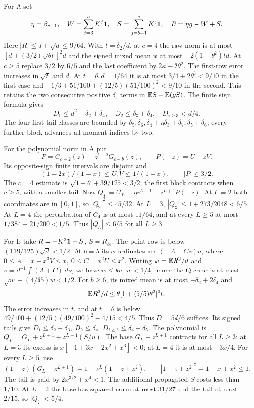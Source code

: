 For A set
\[
 \eta=\beta_{c-1},\quad W=\sum_{j=3}^cK^j\mathbf1,\quad
 S=\sum_{j=b+1}^eK^j\mathbf1,\quad R=\eta g-W+S .
\]
Here \(|R|\le d+\sqrt d\le9/64\).
With \(t=\delta_2/d\), at \(c=4\) the raw norm is at most
\([d+(3/2)\sqrt{\theta t}]^2d\) and the signed mixed mean
is at most \(-2(1-\theta^2)td\).
At \(c\ge5\) replace \(3/2\) by \(6/5\) and the last coefficient
by \(2\kappa-2\theta^2\).
The first-row error increases in \(\sqrt t\) and \(d\).
At \(t=\theta,d=1/64\) it is at most
\(3/4+2\theta^3<9/10\) in the first case and
\(-1/3+51/100+(12/5)(51/100)^2<9/10\) in the second.
This retains the two consecutive positive \(\delta_4\) terms
in \(\mathbb E S-\mathbb E(gS)\).
The finite sign formula gives
\[
 D_1\le d^2+\delta_2+\delta_4,\quad
 D_2\le\delta_3+\delta_4,\quad
 D_{i\ge3}<d/4 .
\]
The four first tail classes are bounded by
\(\delta_5,\delta_6,\delta_4+\eta\delta_3+\delta_7,
\delta_5+\delta_6\); every further block advances all moment
indices by two.

For the polynomial norm in A put
\[
 P=G_{c-2}(z)-z^{b-2}G_{e-b}(z),\qquad P(-z)=U-zV .
\]
Its opposite-sign finite intervals are disjoint and
\[
 (1-2x)/(1-x)\le U,V\le1/(1-x),\qquad |P|\le3/2.
\]
The \(c=4\) estimate is
\(\sqrt{1+\theta}+39/125<3/2\); the first block contracts
when \(c\ge5\), with a smaller tail.
Now \(Q_L=G_L-\eta z^{L-1}+z^{L+1}P(-z)\).
At \(L=2\) both coordinates are in \([0,1]\), so
\(|Q_2|^2\le45/32\).
At \(L=3\), \(|Q_3|\le1+273/2048<6/5\).
At \(L=4\) the perturbation of \(G_4\) is at most \(11/64\),
and at every \(L\ge5\) at most \(1/384+21/200<1/5\).
Thus \(|Q_L|\le6/5\) for all \(L\ge3\).

For B take \(R=-K^3\mathbf1+S\), \(S=R_{be}\).
The point row is below \((119/125)\sqrt d<1/2\).
At \(b=5\) its coordinates are \((-A+Cz)u\), where
\(0\le A=x-x^3V\le x,\ 0\le C=x^2U\le x^2\).
Writing \(w=\mathbb E R^2/d\) and \(v=d^{-1}\int(A+C)\,d\nu\),
we have \(w\le\theta v,\ w<1/4\); hence the Q error is at most
\(\sqrt w-(4/65)w<1/2\).
For \(b\ge6\), its mixed mean is at most
\(-\delta_2+2\delta_4\) and
\[
 \mathbb E R^2/d\le
 \theta[1+(6/5)\theta^2]^2t .
\]
The error increases in \(t\), and at \(t=\theta\) is below
\(49/100+(12/5)(49/100)^2-4/15<4/5\).
Thus \(D=5d/6\) suffices.
Its signed tails give
\(D_1\le\delta_2+\delta_3,\ D_2\le\delta_4,\
D_{i\ge3}\le\delta_4+\delta_5\).
The polynomial is \(Q_L=G_L+z^{L+1}+z^{L-1}(S/u)\).
The base \(G_L+z^{L+1}\) contracts for all \(L\ge3\):
at \(L=3\) its excess is \(x[-1+3x-2x^2+x^3]<0\);
at \(L=4\) it is at most \(-3x/4\).
For every \(L\ge5\), use
\[
 (1-z)(G_L+z^{L+1})
       =1-z^L(1-z+z^2),\qquad
 |1-z+z^2|^2=1-x+x^2\le1 .
\]
The tail is paid by \(2x^{3/2}+x^4<1\).
The additional propagated \(S\) costs less than \(1/10\).
At \(L=2\) the base has squared norm at most \(31/27\)
and the tail at most \(2/15\), so \(|Q_2|<5/4\).

